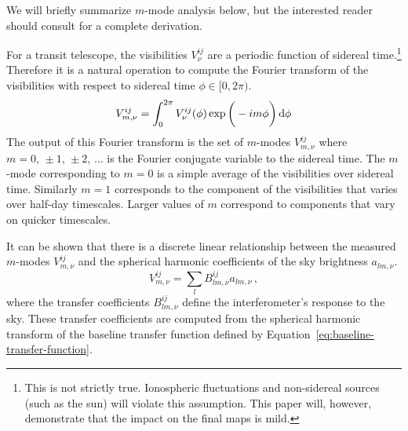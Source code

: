 \documentclass[twocolumn]{aastex61}
\renewcommand{\d}{{\rm d}}
\begin{document}
We will briefly summarize $m$-mode analysis below, but the interested reader should consult
\citet{2014ApJ...781...57S, 2015PhRvD..91h3514S} for a complete derivation.

For a transit telescope, the visibilities $V^{ij}_\nu$ are a periodic function of sidereal
time.\footnote{
    This is not strictly true. Ionospheric fluctuations and non-sidereal sources (such as the sun)
    will violate this assumption. This paper will, however, demonstrate that the impact on the final
    maps is mild.
}
Therefore it is a natural operation to compute the Fourier transform of the visibilities with
respect to sidereal time $\phi\in[0,2\pi)$.
\begin{equation}
    V^{ij}_{m,\nu} = \int_0^{2\pi} V^{ij}_\nu(\phi)\exp\bigg(-im\phi\bigg)\,\d\phi
\end{equation}
The output of this Fourier transform is the set of $m$-modes $V^{ij}_{m,\nu}$ where
$m=0,\,\pm1,\,\pm2,\,\ldots$ is the Fourier conjugate variable to the sidereal time. The $m$-mode
corresponding to $m=0$ is a simple average of the visibilities over sidereal time. Similarly $m=1$
corresponds to the component of the visibilities that varies over half-day timescales. Larger values
of $m$ correspond to components that vary on quicker timescales.

It can be shown that there is a discrete linear relationship between the measured $m$-modes
$V^{ij}_{m,\nu}$ and the spherical harmonic coefficients of the sky brightness $a_{lm,\nu}$.
\begin{equation}\label{eq:m-mode-sum-equation}
    V^{ij}_{m,\nu} = \sum_l B^{ij}_{lm,\nu} a_{lm,\nu}\,,
\end{equation}
where the transfer coefficients $B^{ij}_{lm,\nu}$ define the interferometer's response to the sky.
These transfer coefficients are computed from the spherical harmonic transform of the baseline
transfer function defined by Equation~\ref{eq:baseline-transfer-function}.
\end{document}

